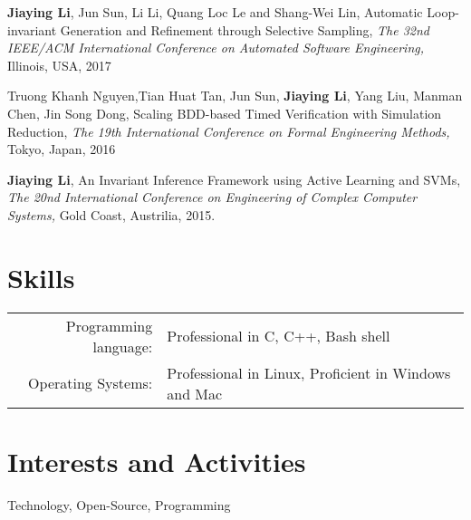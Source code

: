 \documentclass[a4paper,10pt]{article}
\begin{document}
\textbf{Jiaying Li}, Jun Sun, Li Li, Quang Loc Le and Shang-Wei Lin, Automatic Loop-invariant Generation and Refinement through Selective Sampling, {\sl The 32nd IEEE/ACM International Conference on Automated Software Engineering,} Illinois, USA, 2017

Truong Khanh Nguyen,Tian Huat Tan, Jun Sun, \textbf{Jiaying Li}, Yang Liu, Manman Chen, Jin Song Dong, Scaling BDD-based Timed Verification with Simulation Reduction, {\sl The 19th International Conference on Formal Engineering Methods,} Tokyo, Japan, 2016 

\textbf{Jiaying Li}, An Invariant Inference Framework using Active Learning and SVMs, {\sl The 20nd International Conference on Engineering of Complex Computer Systems,} Gold Coast, Austrilia, 2015.

\section{Skills}
\begin{tabular}{rl}
Programming language:& Professional in C, C++, Bash shell\\
Operating Systems: & Professional in Linux, Proficient in Windows and Mac
\end{tabular}


\section{Interests and Activities}
Technology, Open-Source, Programming\\

\end{document}
